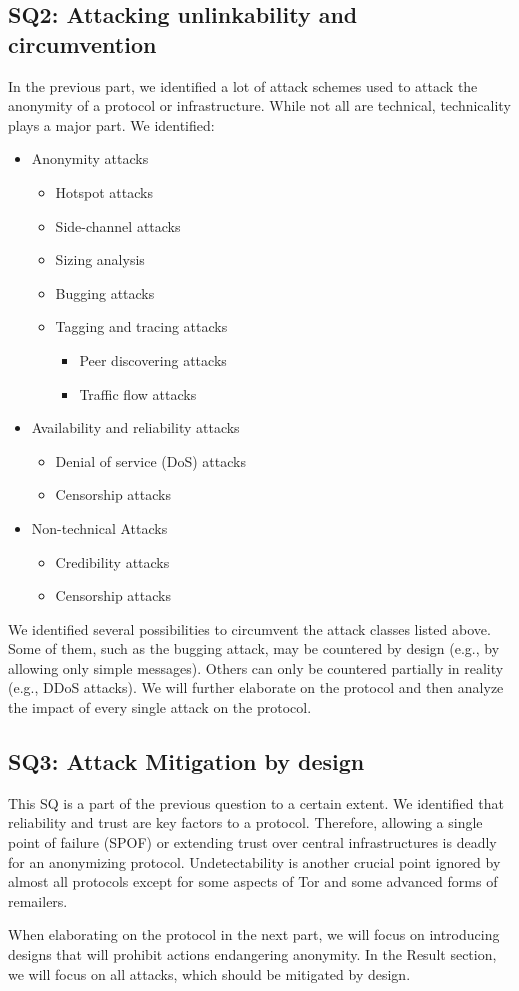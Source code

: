 \subsection{SQ2: Attacking unlinkability and circumvention}
In the previous part, we identified a lot of attack schemes used to attack the anonymity of a protocol or infrastructure. While not all are technical, technicality plays a major part. We identified:
\begin{itemize}
	\item Anonymity attacks
	\begin{itemize}
		\item Hotspot attacks
		\item Side-channel attacks
		\item Sizing analysis
		\item Bugging attacks
		\item Tagging and tracing attacks
		\begin{itemize}
			\item Peer discovering attacks
			\item Traffic flow attacks
		\end{itemize}
	\end{itemize}
	\item Availability and reliability attacks
	\begin{itemize}
		\item Denial of service (DoS) attacks
		\item Censorship attacks
	\end{itemize}
	\item Non-technical Attacks
	\begin{itemize}
		\item Credibility attacks
		\item Censorship attacks
	\end{itemize}
\end{itemize}

We identified several possibilities to circumvent the attack classes listed above. Some of them, such as the bugging attack, may be countered by design (e.g., by allowing only simple messages). Others can only be countered partially in reality (e.g., DDoS attacks). We will further elaborate on the protocol and then analyze the impact of every single attack on the protocol.

\subsection{SQ3: Attack Mitigation by design}
This SQ is a part of the previous question to a certain extent. We identified that reliability and trust are key factors to a protocol. Therefore, allowing a single point of failure (SPOF) or extending trust over central infrastructures is deadly for an anonymizing protocol. Undetectability is another crucial point ignored by almost all protocols except for some aspects of Tor and some advanced forms of remailers.

When elaborating on the protocol in the next part, we will focus on introducing designs that will prohibit actions endangering anonymity. In the Result section, we will focus on all attacks, which should be mitigated by design. 


